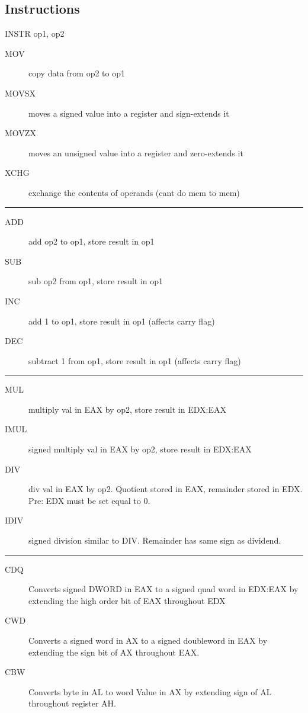 \documentclass[10pt,landscape]{article}
\newcommand{\mysep}{\vspace{0.1cm}\hrule\vspace{0.1cm}}
\begin{document}
\begin{multicols*}{3}
\section{Instructions}

INSTR op1, op2

\begin{description}
  \item[MOV] copy data from op2 to op1
  \item[MOVSX] moves a signed value into a register and sign-extends it
  \item[MOVZX] moves an unsigned value into a register and zero-extends it
  \item[XCHG] exchange the contents of operands (cant do mem to mem)
\end{description}

\mysep

\begin{description}
  \item[ADD] add op2 to op1, store result in op1
  \item[SUB] sub op2 from op1, store result in op1
  \item[INC] add 1 to op1, store result in op1 (affects carry flag)
  \item[DEC] subtract 1 from op1, store result in op1 (affects carry flag)
\end{description}

\mysep

\begin{description}
  \item[MUL] multiply val in EAX by op2, store result in EDX:EAX
  \item[IMUL] signed multiply val in EAX by op2, store result in EDX:EAX
  \item[DIV] div val in EAX by op2. Quotient stored in EAX, remainder stored in
    EDX. Pre: EDX must be set equal to 0.
  \item[IDIV] signed division similar to DIV. Remainder has same sign as
    dividend.
\end{description}

\mysep

\begin{description}
  \item[CDQ] Converts signed DWORD in EAX to a signed quad word in EDX:EAX by
    extending the high order bit of EAX throughout EDX
  \item[CWD] Converts a signed word in AX to a signed doubleword in EAX by
    extending the sign bit of AX throughout EAX.
  \item[CBW] Converts byte in AL to word Value in AX by extending sign of AL
    throughout register AH.
\end{description}


\end{multicols*}
\end{document}
